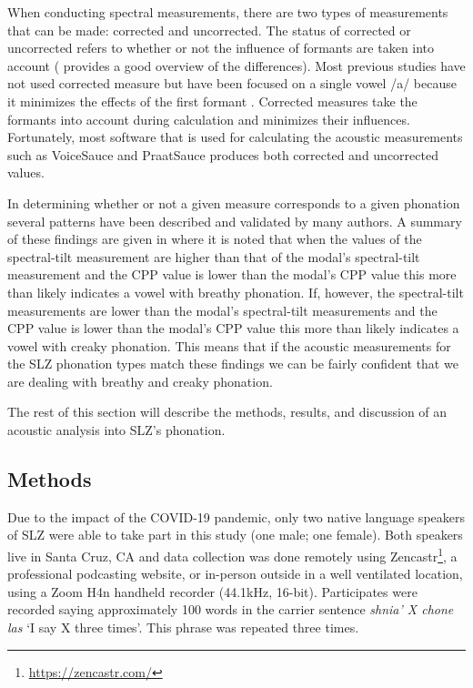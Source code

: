 \documentclass[12pt, letterpaper]{article}
\begin{document}
When conducting spectral measurements, there are two types of measurements that can be made: corrected and uncorrected. The status of corrected or uncorrected refers to whether or not the influence of formants are taken into account (\cite{garellekPhoneticsVoice2019} provides a good overview of the differences). Most previous studies have not used corrected measure but have been focused on a single vowel /a/ because it minimizes the effects of the first formant \citep{espositoVariationContrastivePhonation2010}. Corrected measures take the formants into account during calculation and minimizes their influences. Fortunately, most software that is used for calculating the acoustic measurements such as VoiceSauce \citep{shueVOICESAUCEProgramVoice2009} and PraatSauce \citep{kirbyPraatSauce2022} produces both corrected and uncorrected values. 

In determining whether or not a given measure corresponds to a given phonation several patterns have been described and validated by many authors. A summary of these findings are given in \citet{garellekPhoneticsVoice2019} where it is noted that when the values of the spectral-tilt measurement are higher than that of the modal's spectral-tilt measurement and the CPP value is lower than the modal's CPP value this more than likely indicates a vowel with breathy phonation. If, however, the spectral-tilt measurements are lower than the modal's spectral-tilt measurements and the CPP value is lower than the modal's CPP value this more than likely indicates a vowel with creaky phonation. This means that if the acoustic measurements for the SLZ phonation types match these findings we can be fairly confident that we are dealing with breathy and creaky phonation. 

The rest of this section will describe the methods, results, and discussion of an acoustic analysis into SLZ's phonation. 

\subsection{Methods} \label{sec:Methods}

Due to the impact of the COVID-19 pandemic, only two native language speakers of SLZ were able to take part in this study (one male; one female). Both speakers live in Santa Cruz, CA and data collection was done remotely using Zencastr\footnote{\href{https://zencastr.com/}{https://zencastr.com/}}, a professional podcasting website, or in-person outside in a well ventilated location, using a Zoom H4n handheld recorder (44.1kHz, 16-bit). Participates were recorded saying approximately 100 words in the carrier sentence \textit{shnia' X chone las} `I say X three times'. This phrase was repeated three times. 
\end{document}
